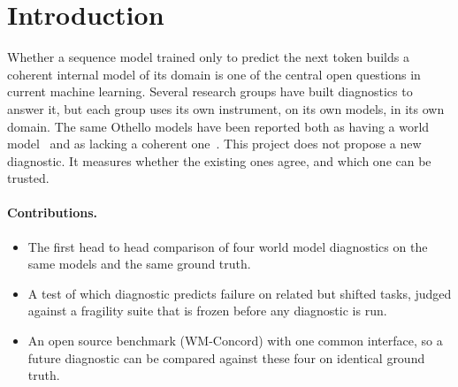\documentclass[11pt]{scrartcl}
\begin{document}
\tableofcontents
\newpage

\section{Introduction}

Whether a sequence model trained only to predict the next token builds a coherent internal model of its
domain is one of the central open questions in current machine learning. Several research groups have built
diagnostics to answer it, but each group uses its own instrument, on its own models, in its own domain. The
same Othello models have been reported both as having a world model~\cite{li2023othello, yuan2025revisiting}
and as lacking a coherent one~\cite{vafa2024evaluating, vafa2025inductive}. This project does not propose a
new diagnostic. It measures whether the existing ones agree, and which one can be trusted.

\paragraph{Contributions.}
\begin{itemize}
    \item The first head to head comparison of four world model diagnostics on the same models and the same
    ground truth.
    \item A test of which diagnostic predicts failure on related but shifted tasks, judged against a
    fragility suite that is frozen before any diagnostic is run.
    \item An open source benchmark (WM-Concord) with one common interface, so a future diagnostic can be
    compared against these four on identical ground truth.
\end{itemize}
\end{document}
